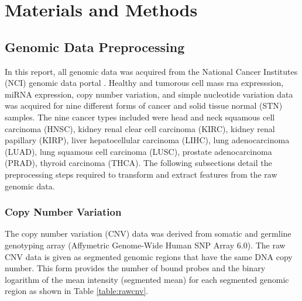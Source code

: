 \chapter{Materials and Methods} \label{chap:experiments}

\section{Genomic Data Preprocessing}

In this report, all genomic data was acquired from the National Cancer Institutes (NCI) genomic data portal \cite{grossman2016toward}. Healthy and tumorous cell mass rna expresssion, miRNA expression, copy number variation, and simple nucleotide variation data was acquired for nine different forms of cancer and solid tissue normal (STN) samples. The nine cancer types included were head and neck squamous cell carcinoma (HNSC), kidney renal clear cell carcinoma (KIRC), kidney renal papillary (KIRP), liver hepatocellular carcinoma (LIHC), lung adenocarcinoma (LUAD), lung squamous cell carcinoma (LUSC), prostate adenocarcinoma (PRAD), thyroid carcinoma (THCA). The following subsections detail the preprocessing steps required to transform and extract features from the raw genomic data.

\subsection{Copy Number Variation}

The copy number variation (CNV) data was derived from somatic and germline genotyping array (Affymetric Genome-Wide Human SNP Array 6.0). The raw CNV data is given as segmented genomic regions that have the same DNA copy number. This form provides the number of bound probes and the binary logarithm of the mean intensity (segmented mean) for each segmented genomic region as shown in Table \ref{table:rawcnv}.

